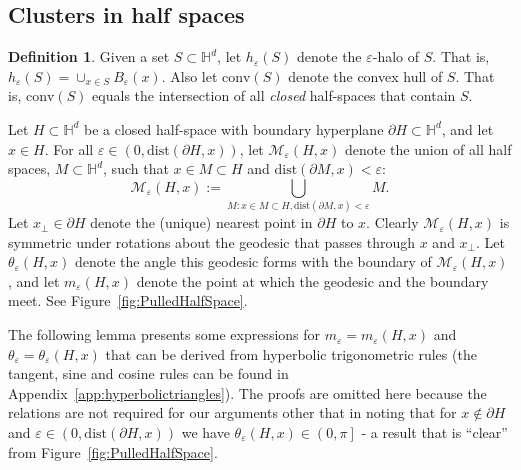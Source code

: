 \documentclass[10pt,a4paper,dvipsnames]{article}
\theoremstyle{definition}
\newtheorem{definition}[theorem]{Definition}
\theoremstyle{remark}
\newcommand{\Mcal}{\mathcal{M}}
\newcommand{\HypDim}{{\mathbb{H}^d}}
\newcommand{\convex}[1]{{\mathrm{conv}\left(#1\right)}}
\newcommand{\dist}[1]{\mathrm{dist}\left(#1\right)}
\numberwithin{equation}{section}
\begin{document}
\subsection{Clusters in half spaces}
\label{sec:ClustersHalfSpace}
    \begin{definition}
        Given a set $S\subset \HypDim$, let $h_\varepsilon\left(S\right)$ denote the $\varepsilon$-halo of $S$. That is, $h_\varepsilon\left(S\right) = \cup_{x\in S}B_\varepsilon(x)$. Also let $\convex{S}$ denote the convex hull of $S$. That is, $\convex{S}$ equals the intersection of all \emph{closed} half-spaces that contain $S$.

    Let $H\subset \HypDim$ be a closed half-space with boundary hyperplane $\partial H\subset \HypDim$, and let $x\in H$. For all $\varepsilon\in\left(0,\dist{\partial H,x}\right)$, let $\Mcal_\varepsilon\left(H,x\right)$ denote the union of all half spaces, $M\subset \HypDim$, such that $x\in M\subset H$ and $\dist{\partial M,x}<\varepsilon$:
    \begin{equation}
        \Mcal_{\varepsilon}\left(H,x\right) := \bigcup_{M\colon x\in M\subset H, \dist{\partial M,x}<\varepsilon} M.
    \end{equation}
    Let $x_\perp\in\partial H$ denote the (unique) nearest point in $\partial H$ to $x$. Clearly $\Mcal_{\varepsilon}\left(H,x\right)$ is symmetric under rotations about the geodesic that passes through $x$ and $x_\perp$. Let $\theta_\varepsilon\left(H,x\right)$ denote the angle this geodesic forms with the boundary of $\Mcal_{\varepsilon}\left(H,x\right)$, and let $m_\varepsilon(H,x)$ denote the point at which the geodesic and the boundary meet.
    See Figure~\ref{fig:PulledHalfSpace}.
    
    The following lemma presents some expressions for $m_\varepsilon = m_\varepsilon(H,x)$ and $\theta_\varepsilon = \theta_\varepsilon\left(H,x\right)$ that can be derived from hyperbolic trigonometric rules (the tangent, sine and cosine rules can be found in Appendix~\ref{app:hyperbolictriangles}). The proofs are omitted here because the relations are not required for our arguments other that in noting that for $x\not\in \partial H$ and $\varepsilon\in\left(0,\dist{\partial H,x}\right)$ we have $\theta_\varepsilon\left(H,x\right)\in\left(0,\pi\right]$ - a result that is ``clear'' from Figure~\ref{fig:PulledHalfSpace}.


    \end{definition}
\end{document}
